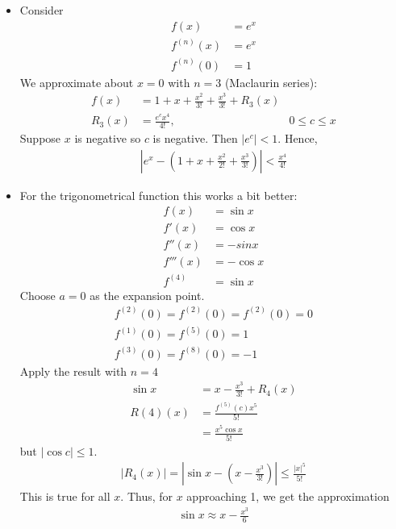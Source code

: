 \begin{ex}
	\begin{itemize}
		\item Consider 
	\begin{align*}
	f(x) & = e^x \\
	f^{(n)}(x) & = e^x \\
	f^{(n)}(0) & = 1
	\end{align*}
	We approximate about $x=0$ with $n=3$ (Maclaurin series):
	\begin{align*}
	f(x) & = 1 +x + \frac{x^2}{3!} + \frac{x^3}{3!} + R_3(x) \\
	R_3(x) & = \frac{e^c x^4}{4!}, & 0 \le c \le x 
	\end{align*}
	Suppose $x$ is negative so $c$ is negative. Then $|e^c| <1$. Hence,
	\begin{align*}
	\left| e^x - \left( 1+x + \frac{x^2}{2!} + \frac{x^3}{3!} \right) \right| < \frac{x^4}{4!}
	\end{align*}
	\item
	For the trigonometrical function this works a bit better:
	\begin{align*}
	f(x) & =  \sin x \\
	f'(x) & = \cos x \\
	f''(x) & = -sin x \\
	f'''(x) & = -\cos x \\
	f^{(4)} & = \sin x
	\end{align*}
	Choose $a = 0$ as the expansion point.
	\begin{align*}
	f^{(2)} (0) = f^{(2)} (0) = f^{(2)} (0) = 0 \\
	f^{(1)} (0) = f^{(5)} (0) =1 \\
	f^{(3)} (0) = f^{(8)} (0) = -1
	\end{align*}
	Apply the result with $n = 4$ 
	\begin{align*}
	\sin x & = x - \frac{x^3}{3!} + R_4(x) \\
	R(4) (x) & = \frac{f^{(5)} (c) x^5}{5!} \\ 
	& = \frac{x^5 \cos x}{5!} 
	\end{align*}
	but $|\cos c | \le 1$.
	\begin{align*}
	|R_4(x)| = \left| \sin x - \left( x - \frac {x^3}{3!} \right) \right| \le \frac{|x|^5}{5!}
	\end{align*}
	This is true for all $x$. Thus, for $x$ approaching 1, we get the approximation
	\begin{align*}
	\sin x \approx x - \frac{x^3}{6}
	\end{align*}
	\end{itemize}
\end{ex}
